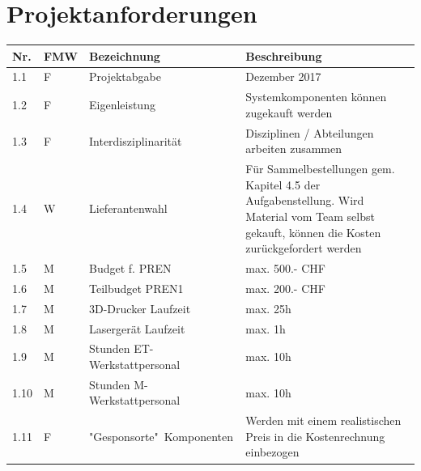 \documentclass[a4paper]{report}
\begin{document}
\section{Projektanforderungen}
\begin{tabular}{|p{}|p{}|p{}|p{}|}
	\hline
	\textbf{Nr.} & \textbf{FMW\footnotemark} & \textbf{Bezeichnung} & \textbf{Beschreibung} \\
	\hline
	1.1 & F & Projektabgabe & Dezember 2017 \\
	\hline
	1.2 & F & Eigenleistung & Systemkomponenten können zugekauft werden \\
	\hline
	1.3 & F & Interdisziplinarität & Disziplinen / Abteilungen arbeiten zusammen \\
	\hline
	1.4 & W & Lieferantenwahl & Für Sammelbestellungen gem. Kapitel 4.5 der Aufgabenstellung. Wird Material vom Team selbst gekauft, können die Kosten zurückgefordert werden \\
	\hline
	1.5 & M & Budget f. PREN & max. 500.- CHF \\
	\hline
	1.6 & M & Teilbudget PREN1 & max. 200.- CHF \\
	\hline
	1.7 & M & 3D-Drucker Laufzeit & max. 25h \\
	\hline
	1.8 & M & Lasergerät Laufzeit & max. 1h \\
	\hline
	1.9 & M & Stunden ET-Werkstattpersonal & max. 10h \\
	\hline
	1.10 & M & Stunden M-Werkstattpersonal & max. 10h \\
	\hline
	1.11 & F & "Gesponsorte"\ Komponenten & Werden mit einem realistischen Preis in die Kostenrechnung einbezogen \\
	\hline
\end{tabular}
\end{document}
